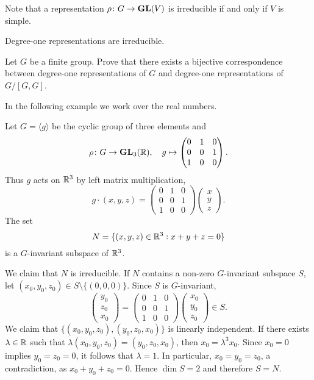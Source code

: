 Note that a representation $\rho\colon G\to\mathbf{GL}(V)$ is irreducible
if and only if $V$ is simple. 

\begin{example}
    Degree-one representations are irreducible. 
\end{example}

\begin{exercise}
\label{xca:degree-one}
    Let $G$ be a finite group. 
    Prove that there exists a bijective correspondence between 
    degree-one representations of $G$ and 
    degree-one representations of $G/[G,G]$. 
\end{exercise}

In the following example we work over the real numbers. 

\begin{example}
Let $G=\langle g\rangle$ be the cyclic group of three elements and 
\[
\rho\colon G\to\mathbf{GL}_3(\mathbb{R}),\quad
g\mapsto\begin{pmatrix}
  0&1&0\\
  0&0&1\\
  1&0&0
\end{pmatrix}.
\]
Thus $g$ acts on $\mathbb{R}^{3}$ by left matrix multiplication,
\[
g\cdot (x,y,z)=
\begin{pmatrix}
  0&1&0\\
  0&0&1\\
  1&0&0
\end{pmatrix}\begin{pmatrix}
x\\
y\\
z
\end{pmatrix}.
\]
The set 
\[
N=\{(x,y,z)\in\mathbb{R}^{3}:x+y+z=0\}
\]
is a $G$-invariant subspace of $\mathbb{R}^3$. 

We claim that $N$ is irreducible. 
If $N$ contains a non-zero $G$-invariant subspace $S$, 
let $(x_0,y_0,z_0)\in S\setminus\{(0,0,0)\}$. Since $S$ is $G$-invariant, 
\[
\begin{pmatrix}
y_0\\
z_0\\
x_0
\end{pmatrix}
=
\begin{pmatrix}
  0&1&0\\
  0&0&1\\
  1&0&0
\end{pmatrix}
\begin{pmatrix}
x_0\\
y_0\\
z_0
\end{pmatrix}\in S.
\]
We claim that $\{(x_0,y_0,z_0),(y_0,z_0,x_0)\}$ is linearly independent. If there exists $\lambda\in\mathbb{R}$ 
such that $\lambda(x_0,y_0,z_0)=(y_0,z_0,x_0)$, then $x_0=\lambda^3 x_0$. Since $x_0=0$ implies 
$y_0=z_0=0$, it follows that $\lambda=1$. In particular, $x_0=y_0=z_0$, a contradiction, as $x_0+y_0+z_0=0$. 
Hence $\dim S=2$ and therefore $S=N$. 
\end{example}

